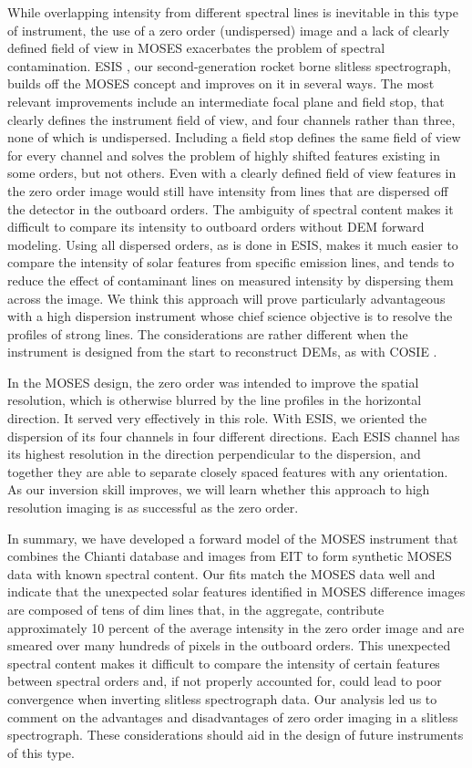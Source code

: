	While overlapping intensity from different spectral lines is inevitable in this type of instrument, the use of a zero order (undispersed) image and a lack of clearly defined field of view in MOSES exacerbates the problem of spectral contamination.
	ESIS \citep{ESIS,Parker2021}, our second-generation rocket borne slitless spectrograph, builds off the MOSES concept and improves on it in several ways. 
	The most relevant improvements include an intermediate focal plane and field stop, that clearly defines the instrument field of view, and four channels rather than three, none of which is undispersed.
	Including a field stop defines the same field of view for every channel and solves the problem of highly shifted features existing in some orders, but not others.
	Even with a clearly defined field of view features in the zero order image would still have intensity from lines that are dispersed off the detector in the outboard orders.
	The ambiguity of spectral content makes it difficult to compare its intensity to outboard orders without DEM forward modeling. 
	Using all dispersed orders, as is done in ESIS, makes it much easier to compare the intensity of solar features from specific emission lines, and tends to reduce the effect of contaminant lines on measured intensity by dispersing them across the image. 
	We think this approach will prove particularly advantageous with a high dispersion instrument whose chief science objective is to resolve the profiles of strong lines. 
	The considerations are rather different when the instrument is designed from the start to reconstruct DEMs, as with COSIE \citep{winebarger2019}.	
	
	In the MOSES design, the zero order was intended to improve the spatial resolution, which is otherwise blurred by the line profiles in the horizontal direction. 
	It served very effectively in this role. 
	With ESIS, we oriented the dispersion of its four channels in four different directions. 
	Each ESIS channel has its highest resolution in the direction perpendicular to the dispersion, and together they are able to separate closely spaced features with any orientation. 
	As our inversion skill improves, we will learn whether this approach to high resolution imaging is  as successful as the zero order.
	
	In summary, we have developed a forward model of the MOSES instrument that combines the Chianti database and images from EIT to form synthetic MOSES data with known spectral content.
	Our fits match the MOSES data well and indicate that the unexpected solar features identified in MOSES difference images are composed of tens of dim lines that, in the aggregate, contribute approximately 10 percent of the average intensity in the zero order image and are smeared over many hundreds of pixels in the outboard orders.
	This unexpected spectral content makes it difficult to compare the intensity of certain features between spectral orders and, if not properly accounted for, could lead to poor convergence when inverting slitless spectrograph data.
	Our analysis led us to comment on the advantages and disadvantages of zero order imaging in a slitless spectrograph. These considerations should aid in the design of future instruments of this type.
	
	
	
	
	
	
